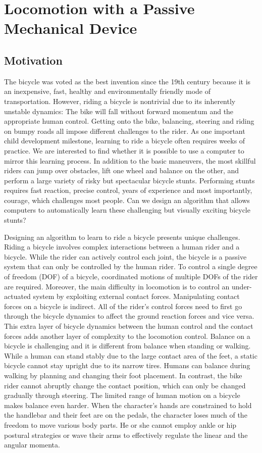 \chapter{Locomotion with a Passive Mechanical Device}
\section{Motivation}

The bicycle was voted as the best invention since the 19th century \cite{BBC2005} because it is an inexpensive, fast, healthy and environmentally friendly mode of transportation. However, riding a bicycle is nontrivial due to its inherently unstable dynamics: The bike will fall without forward momentum and the appropriate human control. Getting onto the bike, balancing, steering and riding on bumpy roads all impose different challenges to the rider. As one important child development milestone, learning to ride a bicycle often requires weeks of practice. We are interested to find whether it is possible to use a computer to mirror this learning process. In addition to the basic maneuvers, the most skillful riders can jump over obstacles, lift one wheel and balance on the other, and perform a large variety of risky but spectacular bicycle stunts. Performing stunts requires fast reaction, precise control, years of experience and most importantly, courage, which challenges most people. Can we design an algorithm that allows computers to automatically learn these challenging but visually exciting bicycle stunts?

Designing an algorithm to learn to ride a bicycle presents unique challenges. Riding a bicycle involves complex interactions between a human rider and a bicycle. While the rider can actively control each joint, the bicycle is a passive system that can only be controlled by the human rider. To control a single degree of freedom (DOF) of a bicycle, coordinated motions of multiple DOFs of the rider are required. Moreover, the main difficulty in locomotion is to control an under-actuated system by exploiting external contact forces. Manipulating contact forces on a bicycle is indirect. All of the rider's control forces need to first go through the bicycle dynamics to affect the ground reaction forces and vice versa. This extra layer of bicycle dynamics between the human control and the contact forces adds another layer of complexity to the locomotion control. Balance on a bicycle is challenging and it is different from balance when standing or walking. While a human can stand stably due to the large contact area of the feet, a static bicycle cannot stay upright due to its narrow tires. Humans can balance during walking by planning and changing their foot placement. In contrast, the bike rider cannot abruptly change the contact position, which can only be changed gradually through steering. The limited range of human motion on a bicycle makes balance even harder. When the character's hands are constrained to hold the handlebar and their feet are on the pedals, the character loses much of the freedom to move various body parts. He or she cannot employ ankle or hip postural strategies or wave their arms to effectively regulate the linear and the angular momenta.


